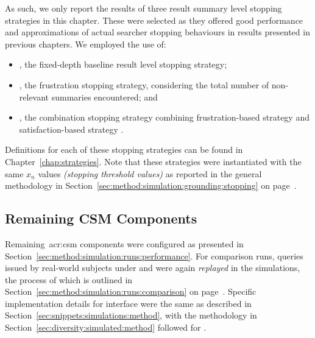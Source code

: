 As such, we only report the results of three result summary level stopping strategies in this chapter. These were selected as they offered good performance and approximations of actual searcher stopping behaviours in results presented in previous chapters. We employed the use of:

\begin{itemize}
    \item{, the fixed-depth baseline result level stopping strategy;}
    \item{, the frustration stopping strategy, considering the total number of non-relevant summaries encountered; and}
    \item{, the combination stopping strategy combining frustration-based strategy  and satisfaction-based strategy .}
\end{itemize}

Definitions for each of these stopping strategies can be found in Chapter~\ref{chap:strategies}. Note that these strategies were instantiated with the same $x_n$ values \emph{(stopping threshold values)} as reported in the general methodology in Section~\ref{sec:method:simulation:grounding:stopping} on page~\pageref{sec:method:simulation:grounding:stopping}.

\subsection{Remaining CSM Components}\label{sec:serp:method:other}
Remaining~\gls{acr:csm} components were configured as presented in Section~\ref{sec:method:simulation:runs:performance}. For comparison runs, queries issued by real-world subjects under  and  were again \emph{replayed} in the simulations, the process of which is outlined in Section~\ref{sec:method:simulation:runs:comparison} on page~\pageref{sec:method:simulation:runs:comparison}. Specific implementation details for interface  were the same as described in Section~\ref{sec:snippets:simulations:method}, with the methodology in Section~\ref{sec:diversity:simulated:method} followed for .

%


